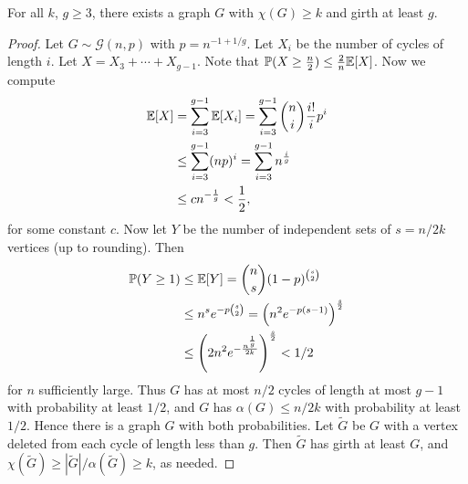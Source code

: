 \documentclass[a3paper, 10pt]{article}
\begin{document}
\begin{multicols*}{5}
\begin{theorem}
    For all $k$, $g \geq 3$, there exists a graph $G$ with $\chi(G) \geq k$ and girth at least $g$.
\end{theorem}
\begin{proof}
    Let $G \sim \mathcal{G}(n, p)$ with $p = n^{-1 + 1/g}$.
    Let $X_i$ be the number of cycles of length $i$. Let $X = X_{3} + \cdots + X_{g - 1}$. Note that $\mathbb{P}(X \geq \frac{n}{2}) \leq \frac{2}{n}\mathbb{E}[X]$. Now we compute 
    \begin{align*}
        \mathbb{E}[X] &= \sum_{i = 3}^{g - 1} \mathbb{E}[X_i] = \sum_{i = 3}^{g - 1} \binom{n}{i} \frac{i!}{i} p^i \\
        &\leq \sum_{i = 3}^{g - 1} (np)^i = \sum_{i = 3}^{g - 1} n^{\frac{i}{g}} \\
        &\leq cn^{-\frac{1}{g}} < \frac{1}{2}, 
    \end{align*}
    for some constant $c$. Now let $Y$ be the number of independent sets of $s = n/2k$ vertices (up to rounding). Then
    \begin{align*}
        \mathbb{P}(Y \geq 1) &\leq \mathbb{E}[Y] = \binom{n}{s} (1 - p)^{\binom{s}{2}} \\ 
        & \leq n^s e^{-p \binom{s}{2}} = \left(n^2 e^{-p(s - 1)}\right)^{\frac{s}{2}} \\
    &\leq \left(2n^2 e^{-\frac{n^{\frac{1}{g}}}{2k}}\right)^{\frac{s}{2}} < 1/2
    \end{align*}
    for $n$ sufficiently large. Thus $G$ has at most $n/2$ cycles of length at most $g - 1$ with probability at least $1/2$, and $G$ has $\alpha(G) \leq n/2k$ with probability at least $1/2$. Hence there is a graph $G$ with both probabilities. Let $\tilde{G}$ be $G$ with a vertex deleted from each cycle of length less than $g$. Then $\tilde G$ has girth at least $G$, and $\chi(\tilde G) \geq |\tilde G|/\alpha(\tilde G) \geq k$, as needed.
\end{proof}

\end{multicols*}
\end{document}
